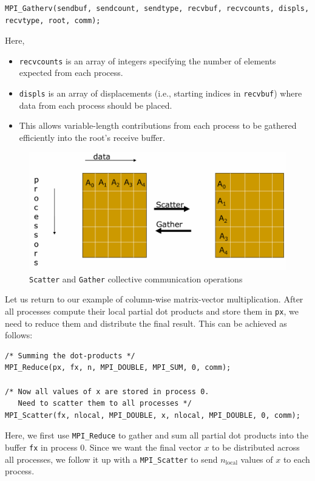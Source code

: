 \documentclass[12pt]{book}
\begin{document}
\begin{lstlisting}[style=cppstyle]
MPI_Gatherv(sendbuf, sendcount, sendtype, recvbuf, recvcounts, displs, recvtype, root, comm);
\end{lstlisting}

Here,
\begin{itemize}
    \item \texttt{recvcounts} is an array of integers specifying the number of elements expected from each process.
    \item \texttt{displs} is an array of displacements (i.e., starting indices in \texttt{recvbuf}) where data from each process should be placed.
    \item This allows variable-length contributions from each process to be gathered efficiently into the root's receive buffer.
\end{itemize}
\begin{figure}[ht]
    \centering
    \includegraphics[width=0.75\linewidth]{images/scatter_gather.png}
    \caption{\texttt{Scatter} and \texttt{Gather} collective communication operations}
    \label{fig:scattergather}
\end{figure}

\vspace{1em}
Let us return to our example of column-wise matrix-vector multiplication. After all processes compute their local partial dot products and store them in \texttt{px}, we need to reduce them and distribute the final result. This can be achieved as follows:

\begin{lstlisting}[style=cppstyle]
/* Summing the dot-products */
MPI_Reduce(px, fx, n, MPI_DOUBLE, MPI_SUM, 0, comm);

/* Now all values of x are stored in process 0. 
   Need to scatter them to all processes */
MPI_Scatter(fx, nlocal, MPI_DOUBLE, x, nlocal, MPI_DOUBLE, 0, comm);
\end{lstlisting}

Here, we first use \texttt{MPI\_Reduce} to gather and sum all partial dot products into the buffer \texttt{fx} in process 0. Since we want the final vector $x$ to be distributed across all processes, we follow it up with a \texttt{MPI\_Scatter} to send $n_\text{local}$ values of $x$ to each process.
\end{document}
